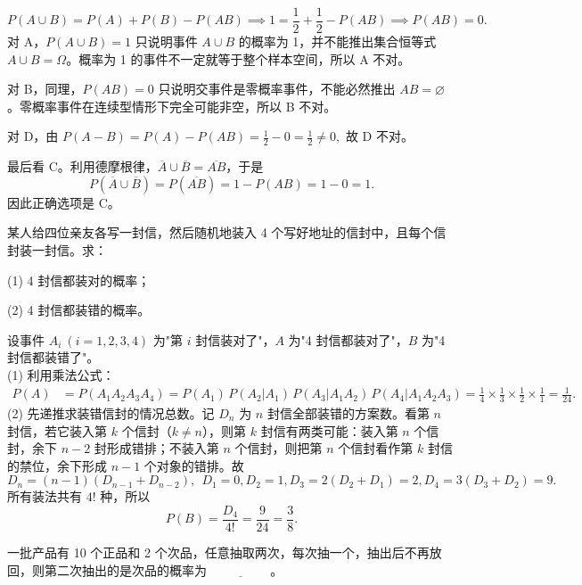 \documentclass[lang=cn,11pt]{elegantbook}
\begin{document}
\begin{solution}
\[
P(A\cup B)=P(A)+P(B)-P(AB)\implies
1=\frac12+\frac12-P(AB)\implies P(AB)=0.
\]
对 A，\(P(A\cup B)=1\) 只说明事件 \(A\cup B\) 的概率为 1，并不能推出集合恒等式 \(A\cup B=\Omega\)。概率为 1 的事件不一定就等于整个样本空间，所以 A 不对。

对 B，同理，\(P(AB)=0\) 只说明交事件是零概率事件，不能必然推出 \(AB=\varnothing\)。零概率事件在连续型情形下完全可能非空，所以 B 不对。

对 D，由
\(
P(A-B)=P(A)-P(AB)=\frac12-0=\frac12\neq 0,
\)
故 D 不对。

最后看 C。利用德摩根律，\(\overline{A}\cup\overline{B}=\overline{AB}\)，于是
\[
P(\overline{A}\cup\overline{B})=P(\overline{AB})=1-P(AB)=1-0=1.
\]
因此正确选项是 C。
\end{solution}


\begin{exercise}\label{exer:1-13}
某人给四位亲友各写一封信，然后随机地装入 4 个写好地址的信封中，且每个信封装一封信。求：
\par
(1) 4 封信都装对的概率；\par
(2) 4 封信都装错的概率。
\end{exercise}
\begin{solution}
设事件 \(A_i\ (i=1,2,3,4)\) 为"第 \(i\) 封信装对了"，\(A\) 为"4 封信都装对了"，\(B\) 为"4 封信都装错了"。\\
(1) 利用乘法公式：
\[
\begin{aligned}
P(A) &= P(A_1 A_2 A_3 A_4) = P(A_1)\,P(A_2|A_1)\,P(A_3|A_1 A_2)\,P(A_4|A_1 A_2 A_3) = \frac{1}{4} \times \frac{1}{3} \times \frac{1}{2} \times \frac{1}{1} = \frac{1}{24}.
\end{aligned}
\]
(2) 先递推求装错信封的情况总数。记 \(D_n\) 为 \(n\) 封信全部装错的方案数。看第 \(n\) 封信，若它装入第 \(k\) 个信封（\(k\ne n\)），则第 \(k\) 封信有两类可能：装入第 \(n\) 个信封，余下 \(n-2\) 封形成错排；不装入第 \(n\) 个信封，则把第 \(n\) 个信封看作第 \(k\) 封信的禁位，余下形成 \(n-1\) 个对象的错排。故
\[
  D_n=(n-1)(D_{n-1}+D_{n-2}),~~D_1=0,D_2=1,D_3=2(D_2+D_1)=2,D_4=3(D_3+D_2)=9.
\]
所有装法共有 \(4!\) 种，所以
\[
  P(B)=\frac{D_4}{4!}=\frac{9}{24}=\frac38.
\]
\end{solution}

\begin{exercise}\label{exer:1-15}
一批产品有 10 个正品和 2 个次品，任意抽取两次，每次抽一个，抽出后不再放回，则第二次抽出的是次品的概率为 \(\underline{\hspace{2cm}}\)。
\end{exercise}
\end{document}
